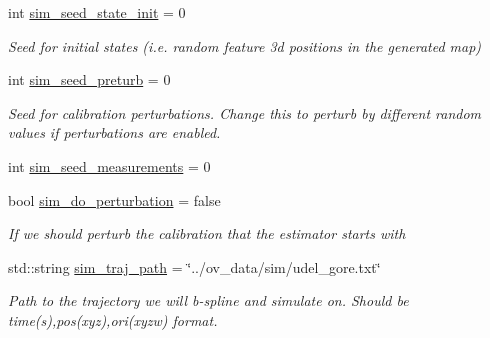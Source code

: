 \begin{DoxyCompactItemize}
int \hyperlink{structov__init_1_1InertialInitializerOptions_a1737eab55d27c05b3663a6b4c908aa6f}{sim\+\_\+seed\+\_\+state\+\_\+init} = 0
\begin{DoxyCompactList}\small\item\em Seed for initial states (i.\+e. random feature 3d positions in the generated map) \end{DoxyCompactList}\item 
\mbox{\label{structov__init_1_1InertialInitializerOptions_aed93d59d66bf7d2f0778a09fb58a0a92}} 
int \hyperlink{structov__init_1_1InertialInitializerOptions_aed93d59d66bf7d2f0778a09fb58a0a92}{sim\+\_\+seed\+\_\+preturb} = 0
\begin{DoxyCompactList}\small\item\em Seed for calibration perturbations. Change this to perturb by different random values if perturbations are enabled. \end{DoxyCompactList}\item 
int \hyperlink{structov__init_1_1InertialInitializerOptions_a4974c2a72613c396477eb322bca919ea}{sim\+\_\+seed\+\_\+measurements} = 0
\item 
\mbox{\label{structov__init_1_1InertialInitializerOptions_af8d57aa321db8dc0a6ae5b5b99bfbd46}} 
bool \hyperlink{structov__init_1_1InertialInitializerOptions_af8d57aa321db8dc0a6ae5b5b99bfbd46}{sim\+\_\+do\+\_\+perturbation} = false
\begin{DoxyCompactList}\small\item\em If we should perturb the calibration that the estimator starts with \end{DoxyCompactList}\item 
\mbox{\label{structov__init_1_1InertialInitializerOptions_aa8e988485f1a07e879d7a01e8e5b5ca3}} 
std\+::string \hyperlink{structov__init_1_1InertialInitializerOptions_aa8e988485f1a07e879d7a01e8e5b5ca3}{sim\+\_\+traj\+\_\+path} = \char`\"{}../ov\+\_\+data/sim/udel\+\_\+gore.\+txt\char`\"{}
\begin{DoxyCompactList}\small\item\em Path to the trajectory we will b-\/spline and simulate on. Should be time(s),pos(xyz),ori(xyzw) format. \end{DoxyCompactList}\item 

\end{DoxyCompactItemize}
